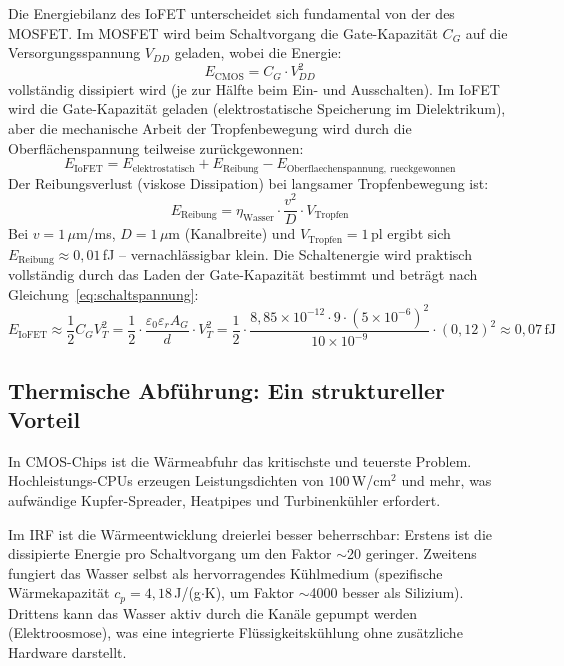 ﻿\documentclass[a4paper,12pt]{scrreprt}
\theoremstyle{definition}
\begin{document}
Die Energiebilanz des IoFET unterscheidet sich fundamental von der des MOSFET.
Im MOSFET wird beim Schaltvorgang die Gate-Kapazität $C_G$ auf die
Versorgungsspannung $V_{DD}$ geladen, wobei die Energie:
\begin{equation}
	E_{\mathrm{CMOS}} = C_G \cdot V_{DD}^2
	\label{eq:cmos_energie}
\end{equation}
vollständig dissipiert wird (je zur Hälfte beim Ein- und Ausschalten).
Im IoFET wird die Gate-Kapazität geladen (elektrostatische Speicherung
im Dielektrikum), aber die mechanische Arbeit der Tropfenbewegung wird
durch die Oberflächenspannung teilweise zurückgewonnen:
\begin{equation}
	E_{\mathrm{IoFET}} = E_{\mathrm{elektrostatisch}} + E_{\mathrm{Reibung}} - E_{\mathrm{Oberflaechenspannung,~rueckgewonnen}}
	\label{eq:iofet_energie}
\end{equation}
Der Reibungsverlust (viskose Dissipation) bei langsamer Tropfenbewegung ist:
\begin{equation}
	E_{\mathrm{Reibung}} = \eta_{\mathrm{Wasser}} \cdot \frac{v^2}{D} \cdot V_{\mathrm{Tropfen}}
	\label{eq:reibungsenergie}
\end{equation}
Bei $v = 1\,\mu$m/ms, $D = 1\,\mu$m (Kanalbreite) und $V_{\mathrm{Tropfen}} = 1$\,pl
ergibt sich $E_{\mathrm{Reibung}} \approx 0{,}01$\,fJ -- vernachlässigbar klein.
Die Schaltenergie wird praktisch vollständig durch das Laden der Gate-Kapazität
bestimmt und beträgt nach Gleichung~\eqref{eq:schaltspannung}:
\begin{equation}
	E_{\mathrm{IoFET}} \approx \frac{1}{2} C_G V_T^2 = \frac{1}{2} \cdot
	\frac{\varepsilon_0 \varepsilon_r A_G}{d} \cdot V_T^2
	= \frac{1}{2} \cdot \frac{8{,}85 \times 10^{-12} \cdot 9 \cdot (5 \times 10^{-6})^2}
	{10 \times 10^{-9}} \cdot (0{,}12)^2 \approx 0{,}07\,\text{fJ}
	\label{eq:schaltenergie_beispiel}
\end{equation}

\subsection{Thermische Abführung: Ein struktureller Vorteil}

In CMOS-Chips ist die Wärmeabfuhr das kritischste und teuerste Problem.
Hochleis\-tungs-CPUs erzeugen Leistungsdichten von $100$\,W/cm$^2$ und mehr,
was aufwändige Kupfer-Spreader, Heatpipes und Turbinenkühler erfordert.

Im IRF ist die Wärme\-entwicklung dreierlei besser beherrschbar:
Erstens ist die dissipierte Energie pro Schaltvorgang um den Faktor
$\sim$20 geringer. Zweitens fungiert das Wasser selbst als hervorragendes
Kühlmedium (spezifische Wärmekapazität $c_p = 4{,}18$\,J/(g$\cdot$K),
um Faktor $\sim$4000 besser als Silizium). Drittens kann das Wasser
aktiv durch die Kanäle gepumpt werden (Elektroosmose), was eine
integrierte Flüssigkeitskühlung ohne zusätzliche Hardware darstellt.
\end{document}
